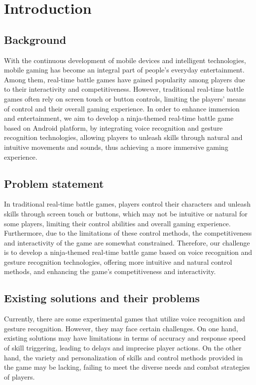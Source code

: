 \documentclass[UTF8,a4paper,12pt]{ctexart}
\numberwithin{equation}{section}
\begin{document}
\newpage
{}
\section{Introduction}
\subsection{Background}
With the continuous development of mobile devices and intelligent technologies, mobile gaming has become an integral part of people's everyday entertainment. Among them, real-time battle games have gained popularity among players due to their interactivity and competitiveness. However, traditional real-time battle games often rely on screen touch or button controls, limiting the players' means of control and their overall gaming experience. In order to enhance immersion and entertainment, we aim to develop a ninja-themed real-time battle game based on Android platform, by integrating voice recognition and gesture recognition technologies, allowing players to unleash skills through natural and intuitive movements and sounds, thus achieving a more immersive gaming experience.
\subsection{Problem statement}
In traditional real-time battle games, players control their characters and unleash skills through screen touch or buttons, which may not be intuitive or natural for some players, limiting their control abilities and overall gaming experience. Furthermore, due to the limitations of these control methods, the competitiveness and interactivity of the game are somewhat constrained. Therefore, our challenge is to develop a ninja-themed real-time battle game based on voice recognition and gesture recognition technologies, offering more intuitive and natural control methods, and enhancing the game's competitiveness and interactivity.
\subsection{Existing solutions and their problems}
Currently, there are some experimental games that utilize voice recognition and gesture recognition. However, they may face certain challenges. On one hand, existing solutions may have limitations in terms of accuracy and response speed of skill triggering, leading to delays and imprecise player actions. On the other hand, the variety and personalization of skills and control methods provided in the game may be lacking, failing to meet the diverse needs and combat strategies of players.
\end{document}
